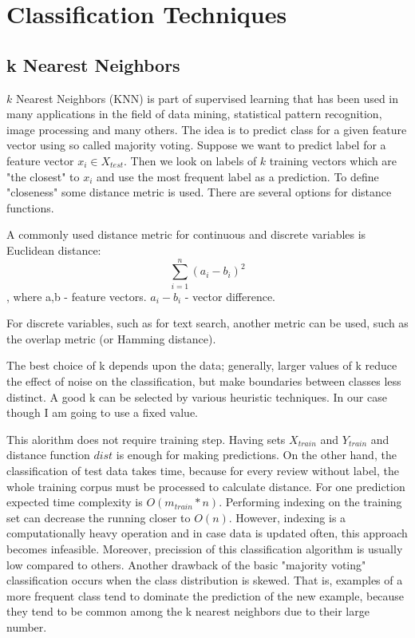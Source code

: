 \documentclass[12pt]{report}
\begin{document}
\newpage

\chapter{Classification Techniques}

\section{k Nearest Neighbors}

$k$ Nearest Neighbors (KNN) is part of supervised learning that has been used in many applications in the field of data mining, statistical pattern recognition, image processing and many others. The idea is to predict class for a given feature vector using so called majority voting. Suppose we want to predict label for a feature vector $x_i \in X_{test}$. Then we look on labels of $k$ training vectors which are "the closest" to $x_i$ and use the most frequent label as a prediction. To define "closeness" some distance metric is used. There are several options for distance functions.

A commonly used distance metric for continuous and discrete variables is Euclidean distance:
$$ \sum_{i=1}^{n} (a_i - b_i)^2$$, where a,b - feature vectors. $a_i - b_i$ - vector difference.

For discrete variables, such as for text search, another metric can be used, such as the overlap metric (or Hamming distance).

The best choice of k depends upon the data; generally, larger values of k reduce the effect of noise on the classification, but make boundaries between classes less distinct. A good k can be selected by various heuristic techniques. In our case though I am going to use a fixed value.

This alorithm does not require training step. Having sets $X_{train}$ and $Y_{train}$ and distance function $dist$ is enough for making predictions. On the other hand, the classification of test data takes time, because for every review without label, the whole training corpus must be processed to calculate distance. For one prediction expected time complexity is $O(m_{train} * n)$. Performing indexing on the training set can decrease the running closer to $O(n)$. However, indexing is a computationally heavy operation and in case data is updated often, this approach becomes infeasible. Moreover, precission of this classification algorithm is usually low compared to others. Another drawback of the basic "majority voting" classification occurs when the class distribution is skewed. That is, examples of a more frequent class tend to dominate the prediction of the new example, because they tend to be common among the k nearest neighbors due to their large number.
\end{document}
